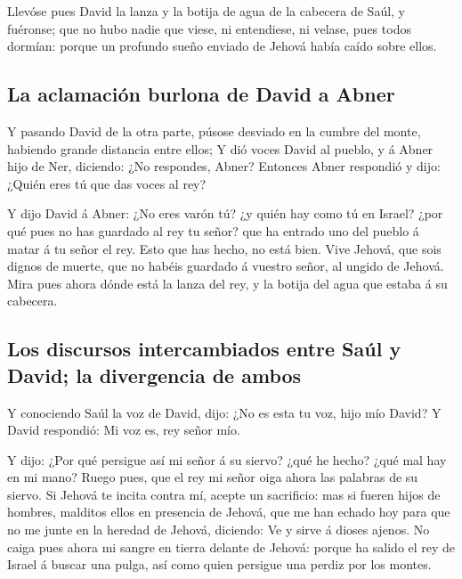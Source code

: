  Llevóse pues David la lanza y la botija de agua de la
cabecera de Saúl, y fuéronse; que no hubo nadie que viese, ni
entendiese, ni velase, pues todos dormían: porque un profundo sueño
enviado de Jehová había caído sobre ellos.

\hypertarget{la-aclamaciuxf3n-burlona-de-david-a-abner}{%
\subsection{La aclamación burlona de David a
Abner}\label{la-aclamaciuxf3n-burlona-de-david-a-abner}}

 Y pasando David de la otra parte, púsose desviado en la
cumbre del monte, habiendo grande distancia entre ellos;  Y
dió voces David al pueblo, y á Abner hijo de Ner, diciendo: ¿No
respondes, Abner? Entonces Abner respondió y dijo: ¿Quién eres tú que
das voces al rey?

 Y dijo David á Abner: ¿No eres varón tú? ¿y quién hay como
tú en Israel? ¿por qué pues no has guardado al rey tu señor? que ha
entrado uno del pueblo á matar á tu señor el rey.  Esto que
has hecho, no está bien. Vive Jehová, que sois dignos de muerte, que no
habéis guardado á vuestro señor, al ungido de Jehová. Mira pues ahora
dónde está la lanza del rey, y la botija del agua que estaba á su
cabecera.

\hypertarget{los-discursos-intercambiados-entre-sauxfal-y-david-la-divergencia-de-ambos}{%
\subsection{Los discursos intercambiados entre Saúl y David; la
divergencia de
ambos}\label{los-discursos-intercambiados-entre-sauxfal-y-david-la-divergencia-de-ambos}}

 Y conociendo Saúl la voz de David, dijo: ¿No es esta tu
voz, hijo mío David? Y David respondió: Mi voz es, rey señor mío.

 Y dijo: ¿Por qué persigue así mi señor á su siervo? ¿qué
he hecho? ¿qué mal hay en mi mano?  Ruego pues, que el rey
mi señor oiga ahora las palabras de su siervo. Si Jehová te incita
contra mí, acepte un sacrificio: mas si fueren hijos de hombres,
malditos ellos en presencia de Jehová, que me han echado hoy para que no
me junte en la heredad de Jehová, diciendo: Ve y sirve á dioses ajenos.
 No caiga pues ahora mi sangre en tierra delante de Jehová:
porque ha salido el rey de Israel á buscar una pulga, así como quien
persigue una perdiz por los montes.

